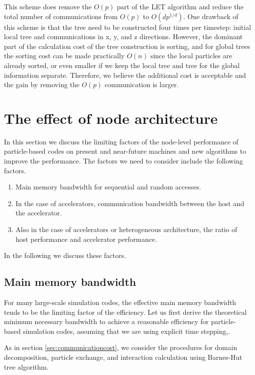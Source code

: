 This scheme does remove the $O(p)$ part of the LET algorithm and
reduce the total number of communications from $O(p)$ to
$O(dp^{1/d})$. One drawback of this scheme is that the tree need to be
constructed four times per timestep: initial local tree and 
communications in x, y, and z directions. However, the dominant part
of the calculation cost of the tree construction is sorting, and for
global trees the sorting cost can be made practically $O(n)$ since the
local particles are already sorted, or even smaller if we keep the
local tree and tree for the global information separate. Therefore, we
believe the additional cost is acceptable and the gain by removing the
$O(p)$ communication is larger.


\section{The effect of node architecture}
\label{sect:singlenode}

In this section we discuss the limiting factors of the node-level
performance of particle-based codes on present and near-future
machines and new algorithms to improve the performance. The factors we
need to consider include the following factors.
\begin{enumerate}

  \item Main memory bandwidth for sequential and random accesses.
 \item In the case of accelerators, communication bandwidth between
   the host and the accelerator.
   \item Also in the case of accelerators or heterogeneous
     architecture, the ratio of host performance
    and accelerator performance.
\end{enumerate}
In the following we discuss these factors.

\subsection{Main memory bandwidth}

For many large-scale simulation codes, the effective main memory
bandwidth tends to be the limiting factor of the efficiency.  Let us
first derive the theoretical minimum necessary bandwidth to achieve a
reasonable efficiency for particle-based simulation codes, assuming
that we are using explicit time stepping,.

As in section \ref{sec:communicationcost}, we consider the procedures
for domain decomposition, particle exchange, and interaction
calculation using Barnes-Hut tree algorithm.

